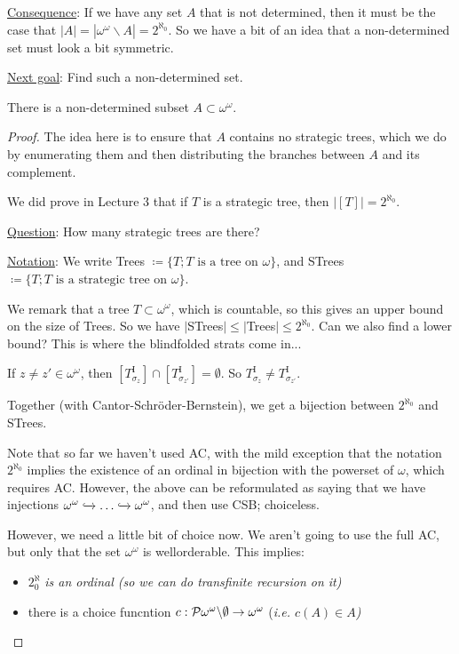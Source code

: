 \documentclass[]{article}
\newcommand{\I}{\textrm{I}}
\newcommand{\om}{\omega}
\begin{document}
\underline{Consequence}: If we have any set $A$ that is not determined, then it must be the case that $|A| = |\om^\om \backslash A| = 2^{\aleph_0}$. So we have a bit of an idea that a non-determined set must look a bit symmetric.

\underline{Next goal}: Find such a non-determined set.

\begin{theorem*}[uses AC]
    There is a non-determined subset $A\subset \om^\om$.
\end{theorem*}
\begin{proof}
    The idea here is to ensure that $A$ contains no strategic trees, which we do by enumerating them and then distributing the branches between $A$ and its complement.

    We did prove in Lecture 3 that if $T$ is a strategic tree, then $|[T]| = 2^{\aleph_0}$.
    
    \underline{Question}: How many strategic trees are there?

    \underline{Notation}: We write Trees $\coloneqq \{T;T\textrm{ is a tree on }\om\}$, and STrees$\coloneqq \{T;T\textrm{ is a strategic tree on }\om\}$.

    We remark that a tree $T\subset \om^\om$, which is countable, so this gives an upper bound on the size of Trees. So we have $|$STrees$|\le|$Trees$|\le2^{\aleph_0}$. Can we also find a lower bound? This is where the blindfolded strats come in...

    If $z\ne z'\in \om^\om$, then $[T^\I_{\sigma_z}]\cap[T^\I_{\sigma_{z'}}] = \emptyset$. So $T_{\sigma_z}^\I \ne T^\I_{\sigma_{z'}}$.

    Together (with Cantor-Schr{\"o}der-Bernstein), we get a bijection between $2^{\aleph_0}$ and STrees.

    Note that so far we haven't used AC, with the mild exception that the notation $2^{\aleph_0}$ implies the existence of an ordinal in bijection with the powerset of $\om$, which requires AC. However, the above can be reformulated as saying that we have injections $\om^\om \xhookrightarrow{} \dots \xhookrightarrow{} \om^\om$, and then use CSB; choiceless.

    However, we need a little bit of choice now. We aren't going to use the full AC, but only that the set $\om^\om$ is wellorderable. This implies:
    \begin{itemize}
        \item $2^\aleph_0$ \it{is} an ordinal (so we can do transfinite recursion on it)
        \item there is a choice funcntion $c:\mathcal{P}\om^\om\backslash \emptyset \ra \om^\om$ (\it{i.e.} $c(A)\in A$)
    \end{itemize}


\end{proof}
\end{document}
